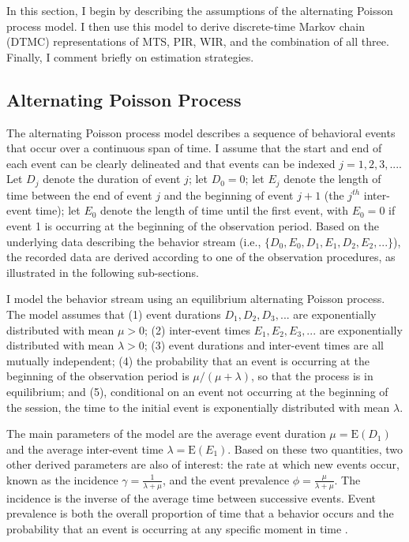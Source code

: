 \documentclass[11pt]{article}
\newcommand{\E}{\text{E}}
\begin{document}
In this section, I begin by describing the assumptions of the alternating Poisson process model. I then use this model to derive discrete-time Markov chain (DTMC) representations of MTS, PIR, WIR, and the combination of all three. Finally, I comment briefly on estimation strategies. 

\subsection{Alternating Poisson Process}
\label{sec:APP}

The alternating Poisson process model describes a sequence of behavioral events that occur over a continuous span of time. I assume that the start and end of each event can be clearly delineated and that events can be indexed $j = 1,2,3,...$. Let $D_j$ denote the duration of event $j$; let $D_0 = 0$; let $E_j$ denote the length of time between the end of event $j$ and the beginning of event $j+1$ (the $j^{th}$ inter-event time); let $E_0$ denote the length of time until the first event, with $E_0 = 0$ if event 1 is occurring at the beginning of the observation period. Based on the underlying data describing the behavior stream (i.e., $\{D_0,E_0,D_1,E_1,D_2,E_2,...\}$), the recorded data are derived according to one of the observation procedures, as illustrated in the following sub-sections. 

I model the behavior stream using an equilibrium alternating Poisson process. The model assumes that (1) event durations $D_1,D_2,D_3,...$ are exponentially distributed with mean $\mu > 0$; (2) inter-event times $E_1,E_2,E_3,...$ are exponentially distributed with mean $\lambda > 0$; (3) event durations and inter-event times are all mutually independent; (4) the probability that an event is occurring at the beginning of the observation period is $\mu / (\mu + \lambda)$, so that the process is in equilibrium; and (5), conditional on an event not occurring at the beginning of the session, the time to the initial event is exponentially distributed with mean $\lambda$. 

The main parameters of the model are the average event duration $\mu = \E(D_1)$ and the average inter-event time $\lambda = \E(E_1)$. Based on these two quantities, two other derived parameters are also of interest: the rate at which new events occur, known as the incidence $\gamma = \frac{1}{\lambda + \mu}$, and the event prevalence $\phi = \frac{\mu}{\lambda + \mu}$. The incidence is the inverse of the average time between successive events. Event prevalence is both the overall proportion of time that a behavior occurs and the probability that an event is occurring at any specific moment in time  \citep{Kulkarni2010modeling, Rogosa1991statistical}. 
\end{document}
